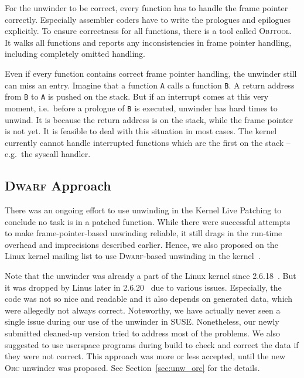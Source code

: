 \documentclass[10pt]{llncs}
\newcommand{\code}[2][]{\lstinline[columns=fullflexible, #1]$#2$}
\newcommand{\dwarf}{\textsc{Dwarf}\xspace}
\newcommand{\objtool}{\textsc{Objtool}\xspace}
\newcommand{\orc}{\textsc{Orc}\xspace}
\begin{document}
For the unwinder to be correct, every function has to handle the frame pointer
correctly. Especially assembler coders have to write the prologues and
epilogues explicitly. To ensure correctness for all functions, there is a tool
called \objtool. It walks all functions and reports any inconsistencies in
frame pointer handling, including completely omitted handling.

Even if every function contains correct frame pointer handling, the unwinder
still can miss an entry. Imagine that a function \code{A} calls a function
\code{B}. A return address from \code{B} to \code{A} is pushed on the stack.
But if an interrupt comes at this very moment, i.e.\ before a prologue of
\code{B} is executed, unwinder has hard times to unwind. It is because the
return address is on the stack, while the frame pointer is not yet. It is
feasible to deal with this situation in most cases. The kernel currently
cannot handle interrupted functions which are the first on the stack -- e.g.\
the syscall handler.

\subsection{\dwarf Approach} \label{sec:unw_dw}
There was an ongoing effort to use unwinding in the Kernel Live Patching to
conclude no task is in a patched function. While there were successful
attempts to make frame-pointer-based unwinding reliable, it still drags in
the run-time overhead and imprecisions described earlier. Hence, we also
proposed on the Linux kernel mailing list to use \dwarf-based unwinding in the
kernel~\cite{patch_add_dwarf}.

Note that the unwinder was already a part of the Linux kernel since
2.6.18~\cite{git_dwarf_upstream_add}. But it was dropped by Linus later in
2.6.20~\cite{git_dwarf_upstream_rm} due to various issues. Especially, the
code was not so nice and readable and it also depends on generated data, which
were allegedly not always correct. Noteworthy, we have actually never seen a
single issue during our use of the unwinder in SUSE. Nonetheless, our newly
submitted cleaned-up version tried to address most of the problems. We also
suggested to use userspace programs during build to check and correct the data
if they were not correct. This approach was more or less accepted, until the
new \orc unwinder was proposed. See Section~\ref{sec:unw_orc} for the details.
\end{document}
